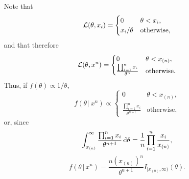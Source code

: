 \begin{ex}
  Note that
  \[
    \mathcal{L}(\theta, x_i)=\begin{cases}
      0          & \theta < x_i,     \\
      x_i/\theta & \text{otherwise},
    \end{cases}
  \]
  and that therefore
  \[
    \mathcal{L}(\theta, x^n)=\begin{cases}
      0                                  & \theta < x_{(n)}, \\
      \frac{\prod_{i=1}^n x_i}{\theta^n} & \text{otherwise}.
    \end{cases}
  \]
  Thus, if $f(\theta)\propto 1/\theta$,
  \[
    f(\theta\,|\, x^n)\propto \begin{cases}
      0                                      & \theta < x_{(n)}, \\
      \frac{\prod_{i=1}^n x_i}{\theta^{n+1}} & \text{otherwise},
    \end{cases}
  \]
  or, since
  \[
    \int_{x_{(n)}}^\infty \frac{\prod_{i=1}^n x_i}{\theta^{n+1}}\,\mathrm{d}\theta
    =\frac{1}{n}\prod_{i=1}^n\frac{x_i}{x_{(n)}},
  \]
  \[
    f(\theta\,|\, x^n)=\frac{n(x_{(n)})^n}{\theta^{n+1}}I_{[x_{(n)},\infty)}(\theta).
  \]
\end{ex}

